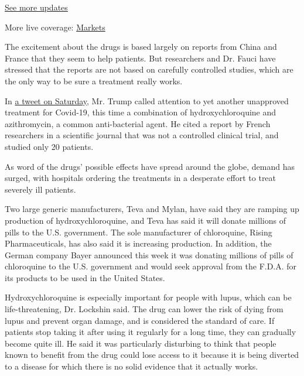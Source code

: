 \href{https://www.nytimes.com/2020/08/04/world/coronavirus-cases.html?action=click\&pgtype=Article\&state=default\&region=MAIN_CONTENT_1\&context=storylines_live_updates}{See
more updates}

More live coverage:
\href{https://www.nytimes.com/live/2020/08/04/business/stock-market-today-coronavirus?action=click\&pgtype=Article\&state=default\&region=MAIN_CONTENT_1\&context=storylines_live_updates}{Markets}

The excitement about the drugs is based largely on reports from China
and France that they seem to help patients. But researchers and Dr.
Fauci have stressed that the reports are not based on carefully
controlled studies, which are the only way to be sure a treatment really
works.

In
\href{https://twitter.com/realDonaldTrump/status/1241367239900778501}{a
tweet on Saturday}, Mr. Trump called attention to yet another unapproved
treatment for Covid-19, this time a combination of hydroxychloroquine
and azithromycin, a common anti-bacterial agent. He cited a report by
French researchers in a scientific journal that was not a controlled
clinical trial, and studied only 20 patients.

As word of the drugs' possible effects have spread around the globe,
demand has surged, with hospitals ordering the treatments in a desperate
effort to treat severely ill patients.

Two large generic manufacturers, Teva and Mylan, have said they are
ramping up production of hydroxychloroquine, and Teva has said it will
donate millions of pills to the U.S. government. The sole manufacturer
of chloroquine, Rising Pharmaceuticals, has also said it is increasing
production. In addition, the German company Bayer announced this week it
was donating millions of pills of chloroquine to the U.S. government and
would seek approval from the F.D.A. for its products to be used in the
United States.

Hydroxychloroquine is especially important for people with lupus, which
can be life-threatening, Dr. Lockshin said. The drug can lower the risk
of dying from lupus and prevent organ damage, and is considered the
standard of care. If patients stop taking it after using it regularly
for a long time, they can gradually become quite ill. He said it was
particularly disturbing to think that people known to benefit from the
drug could lose access to it because it is being diverted to a disease
for which there is no solid evidence that it actually works.

